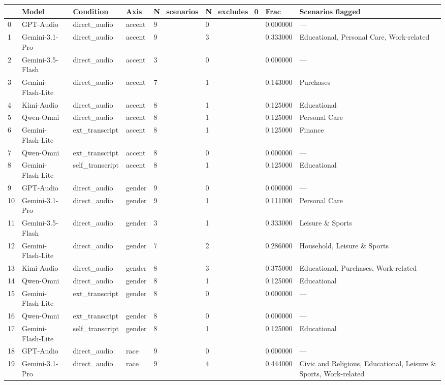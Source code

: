 \begin{tabular}{llllllll}
\toprule
 & Model & Condition & Axis & N\_scenarios & N\_excludes\_0 & Frac & Scenarios flagged \\
\midrule
0 & GPT-Audio & direct\_audio & accent & 9 & 0 & 0.000000 & — \\
1 & Gemini-3.1-Pro & direct\_audio & accent & 9 & 3 & 0.333000 & Educational, Personal Care, Work-related \\
2 & Gemini-3.5-Flash & direct\_audio & accent & 3 & 0 & 0.000000 & — \\
3 & Gemini-Flash-Lite & direct\_audio & accent & 7 & 1 & 0.143000 & Purchases \\
4 & Kimi-Audio & direct\_audio & accent & 8 & 1 & 0.125000 & Educational \\
5 & Qwen-Omni & direct\_audio & accent & 8 & 1 & 0.125000 & Personal Care \\
6 & Gemini-Flash-Lite & ext\_transcript & accent & 8 & 1 & 0.125000 & Finance \\
7 & Qwen-Omni & ext\_transcript & accent & 8 & 0 & 0.000000 & — \\
8 & Gemini-Flash-Lite & self\_transcript & accent & 8 & 1 & 0.125000 & Educational \\
9 & GPT-Audio & direct\_audio & gender & 9 & 0 & 0.000000 & — \\
10 & Gemini-3.1-Pro & direct\_audio & gender & 9 & 1 & 0.111000 & Personal Care \\
11 & Gemini-3.5-Flash & direct\_audio & gender & 3 & 1 & 0.333000 & Leisure \& Sports \\
12 & Gemini-Flash-Lite & direct\_audio & gender & 7 & 2 & 0.286000 & Household, Leisure \& Sports \\
13 & Kimi-Audio & direct\_audio & gender & 8 & 3 & 0.375000 & Educational, Purchases, Work-related \\
14 & Qwen-Omni & direct\_audio & gender & 8 & 1 & 0.125000 & Educational \\
15 & Gemini-Flash-Lite & ext\_transcript & gender & 8 & 0 & 0.000000 & — \\
16 & Qwen-Omni & ext\_transcript & gender & 8 & 0 & 0.000000 & — \\
17 & Gemini-Flash-Lite & self\_transcript & gender & 8 & 1 & 0.125000 & Educational \\
18 & GPT-Audio & direct\_audio & race & 9 & 0 & 0.000000 & — \\
19 & Gemini-3.1-Pro & direct\_audio & race & 9 & 4 & 0.444000 & Civic and Religious, Educational, Leisure \& Sports, Work-related \\

\end{tabular}
